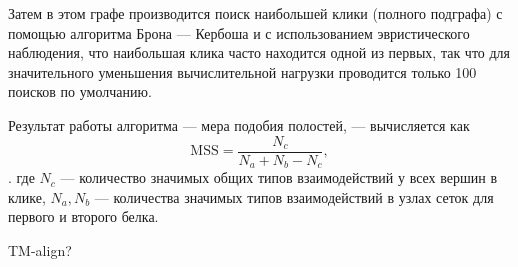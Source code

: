 \documentclass[a4paper,14pt]{article}         %
\begin{document}
Затем в этом графе производится поиск наибольшей клики (полного подграфа) с помощью алгоритма Брона — Кербоша \cite{Bron1973, Tomita2006} и с использованием эвристического наблюдения, что наибольшая клика часто находится одной из первых, так что для значительного уменьшения вычислительной нагрузки проводится только 100 поисков по умолчанию. 

Результат работы алгоритма --- мера подобия полостей, --- вычисляется как
\begin{equation}
\text{MSS} = \frac{N_c}{N_a + N_b - N_c},
\end{equation} \cite{Chartier2015}.
где $N_c$ --- количество значимых общих типов взаимодействий у всех вершин в клике, $N_a, N_b$ --- количества значимых типов взаимодействий в узлах сеток для первого и второго белка. 

\color{orange} TM-align?\color{black}
\end{document}
